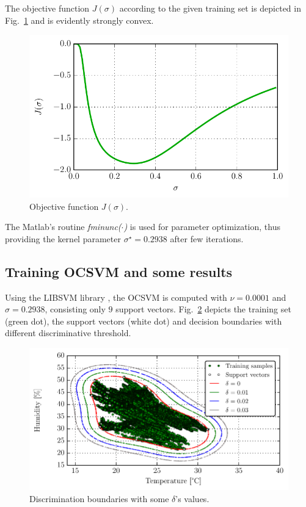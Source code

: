 \documentclass[conference]{IEEEtran}
\begin{document}
The objective function $J(\sigma)$ according to the given training set is depicted in Fig.~\ref{fig:cost_fcn} and is evidently strongly convex.
\begin{figure}[H]
\centering
\includegraphics[scale=.6]{Python/cost_fcn.pdf}
\caption{Objective function $J(\sigma)$. }
\label{fig:cost_fcn}
\end{figure}

The Matlab's routine \emph{fminunc($\cdot$)} is used for parameter optimization, thus providing the kernel parameter $\sigma^\star=0.2938$ after few iterations.

\subsection{Training OCSVM and some results}

Using the LIBSVM library \cite{chang2011}, the OCSVM is computed with $\nu=0.0001$ and $\sigma=0.2938$, consisting only $9$ support vectors. Fig.~\ref{fig:domain_boundary} depicts the training set (green dot), the support vectors (white dot) and decision boundaries with different discriminative threshold. 
\begin{figure}[H]
\centering
\includegraphics[scale=.6]{Python/data_description.pdf}
\caption{Discrimination boundaries with some $\delta$'s values. }
\label{fig:domain_boundary}
\end{figure}
\end{document}
